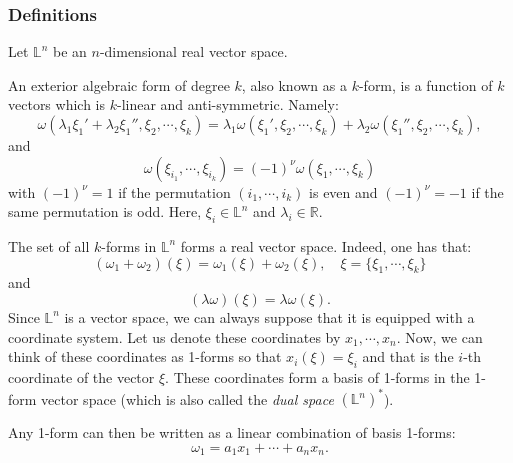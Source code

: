 \subsubsection{Definitions}
Let $\mathbb{L}^n$ be an $n$-dimensional real vector space.
\begin{definition}
An exterior algebraic form of degree $k$, also known as a $k$-form, is
a function of $k$ vectors which is $k$-linear and anti-symmetric. Namely:
\begin{equation}
  \omega(\lambda_1\xi_1' + \lambda_2\xi_1'',\xi_2,\cdots,\xi_k)
  = \lambda_1\omega(\xi_1',\xi_2,\cdots,\xi_k)
  + \lambda_2\omega(\xi_1'',\xi_2,\cdots,\xi_k),
\end{equation}
and
\begin{equation}
  \omega(\xi_{i_1},\cdots,\xi_{i_k}) = (-1)^\nu\omega(\xi_1,\cdots,\xi_k)
\end{equation}
with $(-1)^\nu = 1$ if the permutation $(i_1,\cdots,i_k)$ is even and  $(-1)^\nu
= -1$ if the same permutation is odd. Here, $\xi_i\in\mathbb{L}^n$ and
$\lambda_i\in\mathbb{R}$.
\end{definition}
The set of all $k$-forms in $\mathbb{L}^n$ forms a real vector space. Indeed,
one has that:
\begin{equation}
   (\omega_1+\omega_2)(\xi) = \omega_1(\xi) + \omega_2(\xi), \quad \xi
   = \{\xi_1,\cdots,\xi_k\}
\end{equation}
and
\begin{equation}
  (\lambda\omega)(\xi) = \lambda\omega(\xi).
\end{equation}
Since $\mathbb{L}^n$ is a vector space, we can always suppose that it is
equipped with a coordinate system. Let us denote these coordinates by
$x_1,\cdots,x_n$. Now, we can think of these coordinates as 1-forms so that
$x_i(\xi) = \xi_i$ and that is the $i$-th coordinate of the vector $\xi$. These
coordinates form a basis of 1-forms in the 1-form vector space (which is also
called the \textit{dual space} $(\mathbb{L}^n)^*$).
\par Any 1-form can then be
written as a linear combination of basis 1-forms:
\begin{equation}
  \omega_1 = a_1x_1 + \cdots + a_nx_n.
\end{equation}

